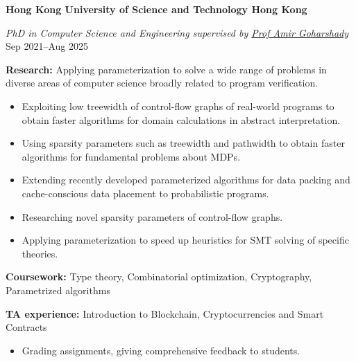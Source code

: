 \textbf{Hong Kong University of Science and Technology \hfill Hong Kong} \par
\textit{PhD in Computer Science and Engineering supervised by \href{https://scholar.google.com/citations?user=4o8gvAYAAAAJ&hl=en&oi=ao}{Prof Amir Goharshady}} \hfill Sep 2021--Aug 2025\par
\textbf{Research:} Applying parameterization to solve a wide range of problems in diverse areas of computer science broadly related to program verification.
    \begin{itemize}
        \item Exploiting low treewidth of control-flow graphs of real-world programs to obtain faster algorithms for domain calculations in abstract interpretation.
        \item Using sparsity parameters such as treewidth and pathwidth to obtain faster algorithms for fundamental problems about MDPs.
        \item Extending recently developed parameterized algorithms for data packing and cache-conscious data placement to probabilistic programs.
        \item Researching novel sparsity parameters of control-flow graphs. 
        \item Applying parameterization to speed up heuristics for SMT solving of specific theories.
    \end{itemize} \par
\textbf{Coursework:} Type theory, Combinatorial optimization, Cryptography, Parametrized algorithms\par
\textbf{TA experience:} Introduction to Blockchain, Cryptocurrencies and Smart Contracts
\begin{itemize}
    \item Grading assignments, giving comprehensive feedback to students.
\end{itemize}

\fi
